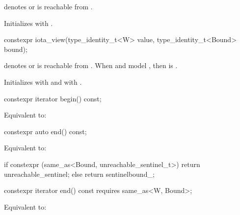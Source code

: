 \begin{itemdescr}
\pnum
\expects
{} denotes  or
 is reachable from .

\pnum
\effects Initializes  with .
\end{itemdescr}

%
\begin{itemdecl}
constexpr iota_view(type_identity_t<W> value, type_identity_t<Bound> bound);
\end{itemdecl}

\begin{itemdescr}
\pnum
\expects
{} denotes  or
 is reachable from .
When  and  model ,
then  is .

\pnum
\effects Initializes  with  and
 with .
\end{itemdescr}

%
\begin{itemdecl}
constexpr iterator begin() const;
\end{itemdecl}

\begin{itemdescr}
\pnum
\effects Equivalent to: 
\end{itemdescr}

%
\begin{itemdecl}
constexpr auto end() const;
\end{itemdecl}

\begin{itemdescr}
\pnum
\effects Equivalent to:
\begin{codeblock}
if constexpr (same_as<Bound, unreachable_sentinel_t>)
  return unreachable_sentinel;
else
  return sentinel{bound_};
\end{codeblock}
\end{itemdescr}

%
\begin{itemdecl}
constexpr iterator end() const requires same_as<W, Bound>;
\end{itemdecl}

\begin{itemdescr}
\pnum
\effects Equivalent to: 
\end{itemdescr}

